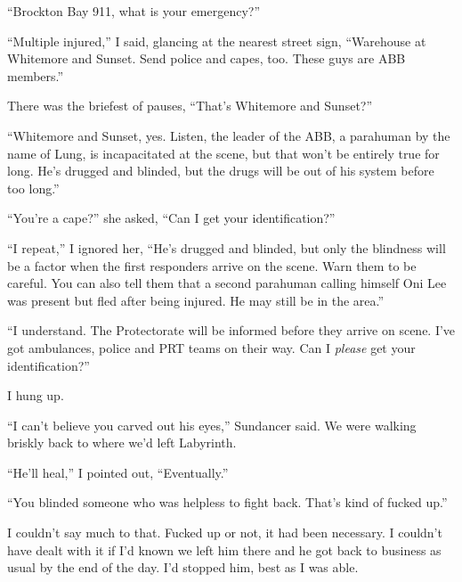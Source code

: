 





``Brockton Bay 911, what is your emergency?''



``Multiple injured,'' I said, glancing at the nearest street sign, ``Warehouse at Whitemore and Sunset.  Send police and capes, too.  These guys are ABB members.''



There was the briefest of pauses, ``That's Whitemore and Sunset?''



``Whitemore and Sunset, yes.  Listen, the leader of the ABB, a parahuman by the name of Lung, is incapacitated at the scene, but that won't be entirely true for long.  He's drugged and blinded, but the drugs will be out of his system before too long.''



``You're a cape?'' she asked, ``Can I get your identification?''



``I repeat,'' I ignored her, ``He's drugged and blinded, but only the blindness will be a factor when the first responders arrive on the scene.  Warn them to be careful.  You can also tell them that a second parahuman calling himself Oni Lee was present but fled after being injured.  He may still be in the area.''



``I understand.  The Protectorate will be informed before they arrive on scene.  I've got ambulances, police and PRT teams on their way.  Can I \emph{please} get your identification?''



I hung up.



``I can't believe you carved out his eyes,'' Sundancer said.  We were walking briskly back to where we'd left Labyrinth.



``He'll heal,'' I pointed out, ``Eventually.''



``You blinded someone who was helpless to fight back.  That's kind of fucked up.''



I couldn't say much to that.  Fucked up or not, it had been necessary.  I couldn't have dealt with it if I'd known we left him there and he got back to business as usual by the end of the day.  I'd stopped him, best as I was able.



